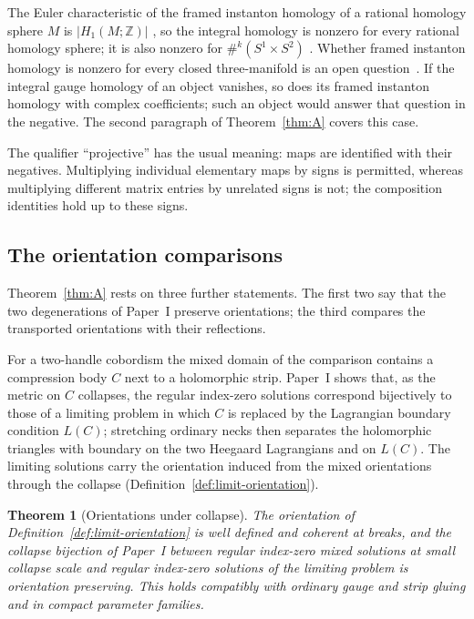 \documentclass[11pt]{amsart}
\theoremstyle{definition}
\theoremstyle{remark}
\theoremstyle{plain}
\newtheorem{thmletter}{Theorem}
\numberwithin{equation}{section}
\newcommand{\ZZ}{\mathbb Z}
\begin{document}
The Euler characteristic of the framed instanton homology of a rational homology sphere $M$ is $|H_1(M;\ZZ)|$ \cite[Corollary~1.4]{Scaduto}, so the integral homology is nonzero for every rational homology sphere; it is also nonzero for $\#^k(S^1\times S^2)$ \cite[Section~7.8]{Scaduto}. Whether framed instanton homology is nonzero for every closed three-manifold is an open question~\cite[Question~1.5]{Yang}. If the integral gauge homology of an object vanishes, so does its framed instanton homology with complex coefficients; such an object would answer that question in the negative. The second paragraph of Theorem~\ref{thm:A} covers this case.

The qualifier ``projective'' has the usual meaning: maps are identified with their negatives.
Multiplying individual elementary maps by signs is permitted, whereas multiplying different matrix
entries by unrelated signs is not; the composition identities hold up to these signs.

\subsection{The orientation comparisons}
Theorem~\ref{thm:A} rests on three further statements. The first two say that the two
degenerations of Paper~I preserve orientations; the third compares the transported orientations
with their reflections.

For a two-handle cobordism the mixed domain of the comparison contains a compression body $C$ next
to a holomorphic strip. Paper~I shows that, as the metric on $C$ collapses, the regular index-zero
solutions correspond bijectively to those of a limiting problem in which $C$ is replaced by the
Lagrangian boundary condition $L(C)$; stretching ordinary necks then separates the holomorphic
triangles with boundary on the two Heegaard Lagrangians and on $L(C)$. The limiting solutions carry
the orientation induced from the mixed orientations through the collapse
(Definition~\ref{def:limit-orientation}).

\begin{thmletter}[Orientations under collapse]\label{thm:B}
The orientation of Definition~\ref{def:limit-orientation} is well defined and coherent at breaks,
and the collapse bijection of Paper~I between regular index-zero mixed solutions at small collapse
scale and regular index-zero solutions of the limiting problem is orientation preserving. This holds
compatibly with ordinary gauge and strip gluing and in compact parameter families.
\end{thmletter}
\end{document}
